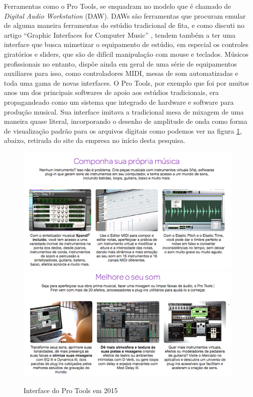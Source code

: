 Ferramentas como o Pro Tools, se enquadram no modelo que é chamado de \emph{Digital Audio Workstation} (DAW). DAWs são ferramentas que procuram emular de alguma maneira ferramentas do estúdio tradicional de fita, e como discuti no artigo ``Graphic Interfaces for Computer Music'' \cite{Stolfi2016}, tendem também a ter uma interface que busca mimetizar o equipamento de estúdio, em especial os controles giratórios e sliders, que são de difícil manipulação com mouse e teclados. Músicos profissionais no entanto, dispõe ainda em geral de uma série de equipamentos auxiliares para isso, como controladores MIDI, mesas de som automatizadas e toda uma gama de novas interfaces. O Pro Tools, por exemplo que foi por muitos anos um dos principais softwares de apoio aos estúdios tradicionais, era propagandeado como um sistema que integrado de hardware e software para produção musical. Sua interface imitava a tradicional mesa de mixagem de uma maneira quase literal, incorporando o desenho de amplitude de onda como forma de visualização padrão para os arquivos digitais como podemos ver na figura \ref{protools}, abaixo, retirada do site da empresa no início desta pesquisa.




\begin{figure}[ht]
    \caption{\label{protools}Interface do Pro Tools em 2015 }
    \begin{center}
        \includegraphics[width=1\linewidth]{pictures/protools}
        \includegraphics[width=1\linewidth]{pictures/protools2}
    \end{center}
\end{figure}

